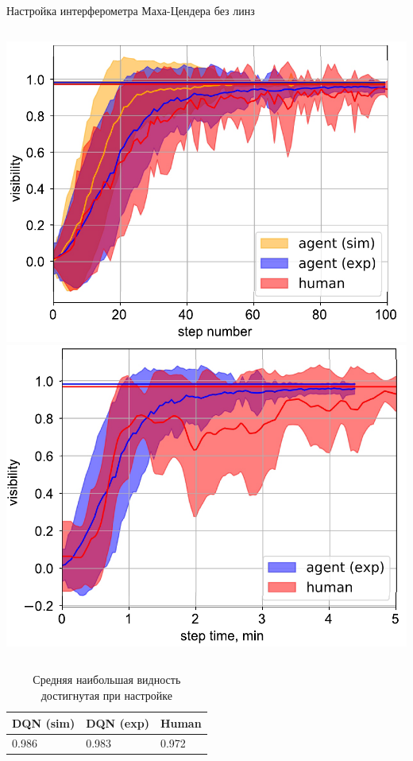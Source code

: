 \begin{frame}[allowframebreaks]{Настройка интерферометра Маха-Цендера без линз}
\begin{columns}
\centering
\includegraphics[width=1\linewidth]{images/eval1_visib_step.pdf}
\includegraphics[width=1\linewidth]{images/eval1_visib_time.pdf}
\end{columns}

\vspace{-10pt}

\begin{table} [htbp]
    \centering
    \begin{threeparttable}
        \caption*{Средняя наибольшая видность достигнутая при настройке}
        \begin{tabular}{| p{3cm} || p{3cm} || p{3cm} |}
            \hline
            \hline
            DQN (sim) & DQN (exp) & Human \\
            \hline
            0.986 & 0.983 & 0.972 \\
            \hline
            \hline
        \end{tabular}
    \end{threeparttable}
\end{table}


\end{frame}
